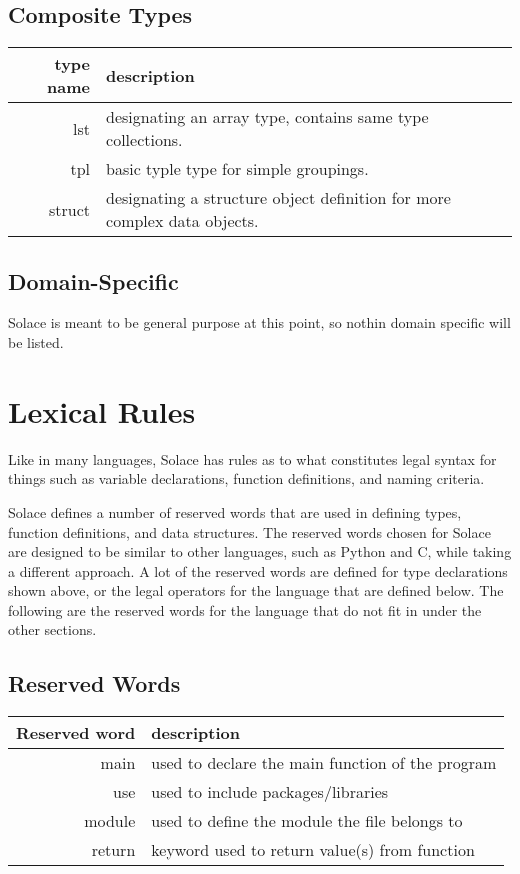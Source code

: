 \documentclass{article}
\begin{document}
\subsection{Composite Types}
\begin{tabular}{r|l}
	type name & description \\
	\hline
	\hline
	lst & designating an array type, contains same type collections. \\
	tpl & basic typle type for simple groupings. \\
	struct & designating a structure object definition for more complex data objects. \\
	\hline
\end{tabular}

\subsection{Domain-Specific}
Solace is meant to be general purpose at this point, so nothin domain specific will be listed.


\section{Lexical Rules}
Like in many languages, Solace has rules as to what constitutes legal syntax for things such as
variable declarations, function definitions, and naming criteria.

Solace defines a number of reserved words that are used in defining types, function definitions,
and data structures. The reserved words chosen for Solace are designed to be similar to
other languages, such as Python and C, while taking a different approach. A lot of the
reserved words are defined for type declarations shown above, or the legal operators for the 
language that are defined below. The following are the reserved words for the language
that do not fit in under the other sections.

\subsection{Reserved Words}

\begin{tabular}{r|l}
Reserved word & description \\
\hline
\hline
main & used to declare the main function of the program \\
use & used to include packages/libraries \\
module & used to define the module the file belongs to \\
return & keyword used to return value(s) from function \\
\hline
\end{tabular}
\end{document}
